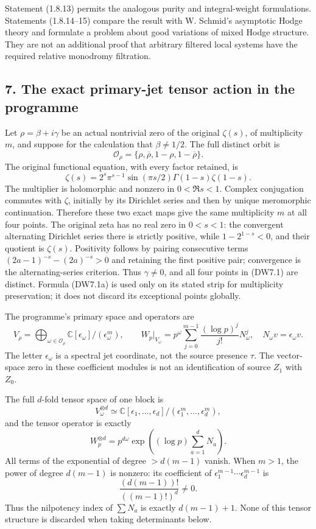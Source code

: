 Statement (1.8.13) permits the analogous purity and integral-weight
formulations. Statements (1.8.14--15) compare the result with W.
Schmid's asymptotic Hodge theory and formulate a problem about good
variations of mixed Hodge structure. They are not an additional proof
that arbitrary filtered local systems have the required relative
monodromy filtration.

\subsection{7. The exact primary-jet tensor action in the
programme}\label{the-exact-primary-jet-tensor-action-in-the-programme}

Let \(\rho=\beta+i\gamma\) be an actual nontrivial zero of the original
\(\zeta(s)\), of multiplicity \(m\), and suppose for the calculation
that \(\beta\ne1/2\). The full distinct orbit is \[
\mathcal O_\rho=\{\rho,\overline\rho,1-\rho,1-\overline\rho\}.
\tag{DW7.1}
\] The original functional equation, with every factor retained, is \[
\zeta(s)=2^s\pi^{s-1}\sin(\pi s/2)\Gamma(1-s)\zeta(1-s).
\tag{DW7.1a}
\] The multiplier is holomorphic and nonzero in \(0<\Re s<1\). Complex
conjugation commutes with \(\zeta\), initially by its Dirichlet series
and then by unique meromorphic continuation. Therefore these two exact
maps give the same multiplicity \(m\) at all four points. The original
zeta has no real zero in \(0<s<1\): the convergent alternating Dirichlet
series there is strictly positive, while \(1-2^{1-s}<0\), and their
quotient is \(\zeta(s)\). Positivity follows by pairing consecutive
terms \((2a-1)^{-s}-(2a)^{-s}>0\) and retaining the first positive pair;
convergence is the alternating-series criterion. Thus \(\gamma\ne0\),
and all four points in (DW7.1) are distinct. Formula (DW7.1a) is used
only on its stated strip for multiplicity preservation; it does not
discard its exceptional points globally.

The programme's primary space and operators are \[
V_\rho=\bigoplus_{\omega\in\mathcal O_\rho}\mathbb C[\epsilon_\omega]/(\epsilon_\omega^m),
\qquad
W_p|_{V_\omega}
=p^\omega\sum_{j=0}^{m-1}\frac{(\log p)^j}{j!}N_\omega^j,
\quad
N_\omega v=\epsilon_\omega v.
\tag{DW7.2}
\] The letter \(\epsilon_\omega\) is a spectral jet coordinate, not the
source presence \(\tau\). The vector-space zero in these coefficient
modules is not an identification of source \(Z_1\) with \(Z_0\).

The full \(d\)-fold tensor space of one block is \[
V_\omega^{\otimes d}
\simeq
\mathbb C[\epsilon_1,\ldots,\epsilon_d]/
(\epsilon_1^m,\ldots,\epsilon_d^m),
\tag{DW7.3}
\] and the tensor operator is exactly \[
W_p^{\otimes d}
=p^{d\omega}\exp\left((\log p)\sum_{a=1}^dN_a\right).
\tag{DW7.4}
\] All terms of the exponential of degree \(>d(m-1)\) vanish. When
\(m>1\), the power of degree \(d(m-1)\) is nonzero: its coefficient of
\(\epsilon_1^{m-1}\cdots\epsilon_d^{m-1}\) is \[
\frac{(d(m-1))!}{((m-1)!)^d}\ne0.
\tag{DW7.5}
\] Thus the nilpotency index of \(\sum N_a\) is exactly \(d(m-1)+1\).
None of this tensor structure is discarded when taking determinants
below.

